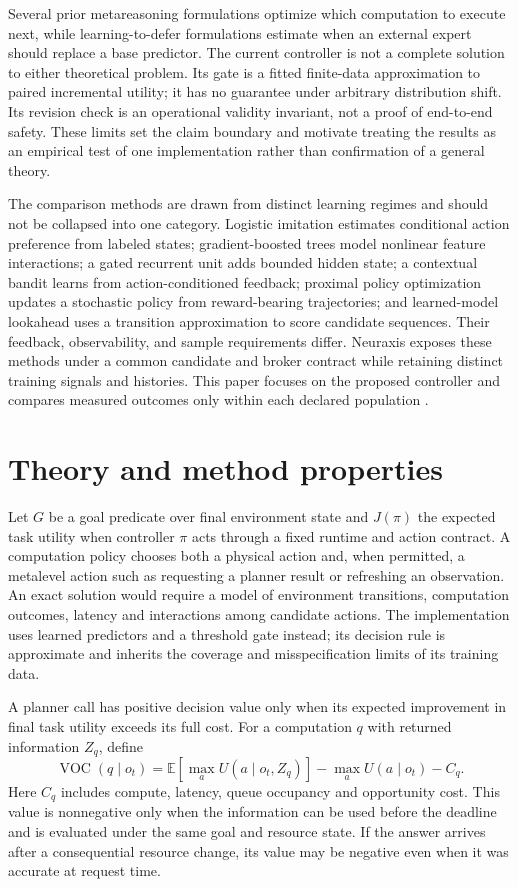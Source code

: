 \documentclass[11pt]{article}
\begin{document}
Several prior metareasoning formulations optimize which computation to execute next, while learning-to-defer formulations estimate when an external expert should replace a base predictor. The current controller is not a complete solution to either theoretical problem. Its gate is a fitted finite-data approximation to paired incremental utility; it has no guarantee under arbitrary distribution shift. Its revision check is an operational validity invariant, not a proof of end-to-end safety. These limits set the claim boundary and motivate treating the results as an empirical test of one implementation rather than confirmation of a general theory.

The comparison methods are drawn from distinct learning regimes and should not be collapsed into one category. Logistic imitation estimates conditional action preference from labeled states; gradient-boosted trees model nonlinear feature interactions; a gated recurrent unit adds bounded hidden state; a contextual bandit learns from action-conditioned feedback; proximal policy optimization updates a stochastic policy from reward-bearing trajectories; and learned-model lookahead uses a transition approximation to score candidate sequences. Their feedback, observability, and sample requirements differ. Neuraxis exposes these methods under a common candidate and broker contract while retaining distinct training signals and histories. This paper focuses on the proposed controller and compares measured outcomes only within each declared population \cite{friedman2001,chen2016,cho2014,li2010,schulman2017,suttonbarto2018}.


\section{Theory and method properties}
Let $G$ be a goal predicate over final environment state and $J(\pi)$ the expected task utility when controller $\pi$ acts through a fixed runtime and action contract. A computation policy chooses both a physical action and, when permitted, a metalevel action such as requesting a planner result or refreshing an observation. An exact solution would require a model of environment transitions, computation outcomes, latency and interactions among candidate actions. The implementation uses learned predictors and a threshold gate instead; its decision rule is approximate and inherits the coverage and misspecification limits of its training data.

A planner call has positive decision value only when its expected improvement in final task utility exceeds its full cost. For a computation $q$ with returned information $Z_q$, define
\begin{equation}
\operatorname{VOC}(q\mid o_t)=\mathbb{E}\!\left[\max_a U(a\mid o_t,Z_q)\right]-\max_a U(a\mid o_t)-C_q .
\end{equation}
Here $C_q$ includes compute, latency, queue occupancy and opportunity cost. This value is nonnegative only when the information can be used before the deadline and is evaluated under the same goal and resource state. If the answer arrives after a consequential resource change, its value may be negative even when it was accurate at request time.
\end{document}
